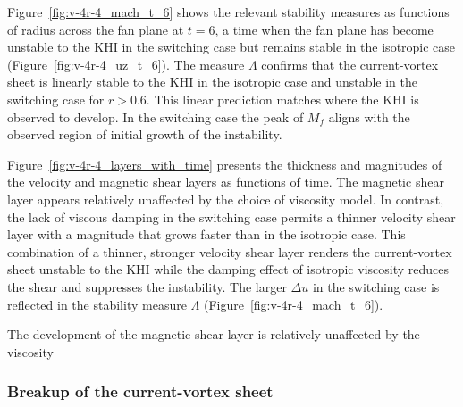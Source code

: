 Figure~\ref{fig:v-4r-4_mach_t_6} shows the relevant stability measures as functions of radius across the fan plane at $t=6$, a time when the fan plane has become unstable to the KHI in the switching case but remains stable in the isotropic case (Figure~\ref{fig:v-4r-4_uz_t_6}). The measure $\Lambda$ confirms that the current-vortex sheet is linearly stable to the KHI in the isotropic case and unstable in the switching case for $r>0.6$. This linear prediction matches where the KHI is observed to develop. In the switching case the peak of $M_f$ aligns with the observed region of initial growth of the instability.

Figure~\ref{fig:v-4r-4_layers_with_time} presents the thickness and magnitudes of the velocity and magnetic shear layers as functions of time. The magnetic shear layer appears relatively unaffected by the choice of viscosity model. In contrast, the lack of viscous damping in the switching case permits a thinner velocity shear layer with a magnitude that grows faster than in the isotropic case. This combination of a thinner, stronger velocity shear layer renders the current-vortex sheet unstable to the KHI while the damping effect of isotropic viscosity reduces the shear and suppresses the instability. The larger $\Delta u$ in the switching case is reflected in the stability measure $\Lambda$ (Figure~\ref{fig:v-4r-4_mach_t_6}).

The development of the magnetic shear layer is relatively unaffected by the viscosity 

\subsubsection{Breakup of the current-vortex sheet}

